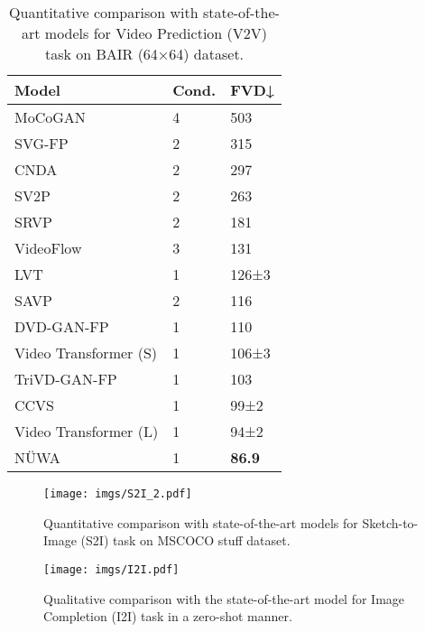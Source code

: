 \documentclass[10pt,twocolumn,letterpaper]{article}
\begin{document}
\begin{table}[t]
\footnotesize
\begin{center}
\caption{Quantitative comparison with state-of-the-art models for Video Prediction (V2V) task on BAIR (64×64) dataset.}
\label{tab:v2v}
\begin{tabular}{p{4.6cm}p{1.3cm}p{1.3cm}}
\toprule
Model                            & Cond. & FVD↓  \\
\midrule
MoCoGAN\cite{tulyakovMocoganDecomposingMotion2018}                 & 4     & 503   \\
SVG-FP\cite{dentonStochasticVideoGeneration2018}                   & 2     & 315   \\
CNDA\cite{finnUnsupervisedLearningPhysical2016a}                     & 2     & 297   \\
SV2P\cite{babaeizadehStochasticVariationalVideo2017a}                     & 2     & 263   \\
SRVP\cite{franceschiStochasticLatentResidual2020}                  & 2     & 181   \\
VideoFlow\cite{kumarVideoflowConditionalFlowbased2019}                & 3     & 131   \\
LVT\cite{rakhimovLatentVideoTransformer2020}                      & 1     & 126±3 \\
SAVP\cite{leeStochasticAdversarialVideo2018} &2 & 116 \\
DVD-GAN-FP\cite{clarkWhatDoesBert2019}   & 1     & 110   \\
Video   Transformer (S)\cite{weissenbornScalingAutoregressiveVideo2020}  & 1     & 106±3 \\
TriVD-GAN-FP\cite{lucTransformationbasedAdversarialVideo2020}             & 1     & 103   \\
CCVS\cite{moingCCVSContextawareControllable2021}                  & 1     & 99±2  \\
Video   Transformer (L)\cite{weissenbornScalingAutoregressiveVideo2020}  & 1     & 94±2  \\
\midrule
NÜWA                             & 1     & \textbf{86.9}  \\
\bottomrule
\end{tabular}
\end{center}
\vspace{-5mm}
\end{table}

\begin{figure}[t]
	\centering
	\texttt{[image: imgs/S2I\_2.pdf]}
	\caption{Quantitative comparison with state-of-the-art models for Sketch-to-Image (S2I) task on MSCOCO stuff dataset.}
	\label{fig:S2I}
	\vspace{-4mm}
\end{figure}
\begin{figure}[t]
	\centering
	\texttt{[image: imgs/I2I.pdf]}
	\caption{Qualitative comparison with the state-of-the-art model for Image Completion (I2I) task in a zero-shot manner.}
	\label{fig:I2I}
	\vspace{-5mm}
\end{figure}
\end{document}

